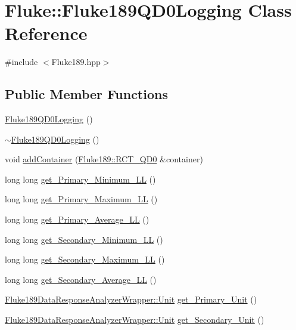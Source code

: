 \hypertarget{classFluke_1_1Fluke189QD0Logging}{
\section{Fluke::Fluke189QD0Logging Class Reference}
\label{classFluke_1_1Fluke189QD0Logging}
}


{\ttfamily \#include $<$Fluke189.hpp$>$}\subsection*{Public Member Functions}
\begin{DoxyCompactItemize}
\item 
\hyperlink{classFluke_1_1Fluke189QD0Logging_ab856daf79c71ace0841c10c9f9b8f9e6}{Fluke189QD0Logging} ()
\item 
\hyperlink{classFluke_1_1Fluke189QD0Logging_ac134feed3bec91193ba7ffd119f9833d}{$\sim$Fluke189QD0Logging} ()
\item 
void \hyperlink{classFluke_1_1Fluke189QD0Logging_af06d4058c124e5b13893311145d529d2}{addContainer} (\hyperlink{classFluke_1_1Fluke189_a9a5b405bb506cd2482de2f8bb0bea189}{Fluke189::RCT\_\-QD0} \&container)
\item 
long long \hyperlink{classFluke_1_1Fluke189QD0Logging_af4535d1fe0f684efc4ffe4df66a3cec6}{get\_\-Primary\_\-Minimum\_\-LL} ()
\item 
long long \hyperlink{classFluke_1_1Fluke189QD0Logging_a583f6614ac6b917bb151cd4cd93dc41d}{get\_\-Primary\_\-Maximum\_\-LL} ()
\item 
long long \hyperlink{classFluke_1_1Fluke189QD0Logging_a29473a5a7d016d020f0948fcf3e31e50}{get\_\-Primary\_\-Average\_\-LL} ()
\item 
long long \hyperlink{classFluke_1_1Fluke189QD0Logging_a4086fe72824fc857356582a962d78678}{get\_\-Secondary\_\-Minimum\_\-LL} ()
\item 
long long \hyperlink{classFluke_1_1Fluke189QD0Logging_a6f0d87ff7022cf47120fd477698639ea}{get\_\-Secondary\_\-Maximum\_\-LL} ()
\item 
long long \hyperlink{classFluke_1_1Fluke189QD0Logging_a1f33bcc2d2342018f0a1ef5b4ec3caa0}{get\_\-Secondary\_\-Average\_\-LL} ()
\item 
\hyperlink{classFluke_1_1Fluke189DataResponseAnalyzerWrapper_ab8e5f2306e4d2ad3d741d273793aaed1}{Fluke189DataResponseAnalyzerWrapper::Unit} \hyperlink{classFluke_1_1Fluke189QD0Logging_a864f0f60f6995d5d035163caf0651565}{get\_\-Primary\_\-Unit} ()
\item 
\hyperlink{classFluke_1_1Fluke189DataResponseAnalyzerWrapper_ab8e5f2306e4d2ad3d741d273793aaed1}{Fluke189DataResponseAnalyzerWrapper::Unit} \hyperlink{classFluke_1_1Fluke189QD0Logging_a7d50361ed373ebaf4bf9cd7bf101f93d}{get\_\-Secondary\_\-Unit} ()
\end{DoxyCompactItemize}


